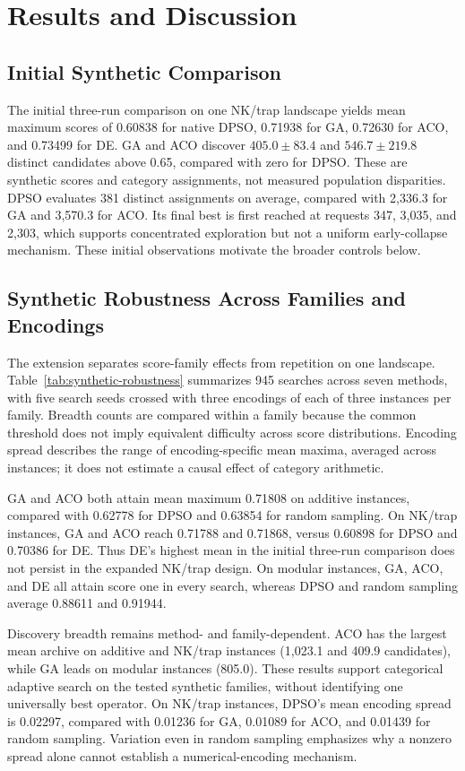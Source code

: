 \section{Results and Discussion}
\label{sec:results}

\subsection{Initial Synthetic Comparison}
The initial three-run comparison on one NK/trap landscape yields mean maximum scores of 0.60838 for native DPSO, 0.71938 for GA, 0.72630 for ACO, and 0.73499 for DE. GA and ACO discover $405.0\pm83.4$ and $546.7\pm219.8$ distinct candidates above 0.65, compared with zero for DPSO. These are synthetic scores and category assignments, not measured population disparities. DPSO evaluates 381 distinct assignments on average, compared with 2,336.3 for GA and 3,570.3 for ACO. Its final best is first reached at requests 347, 3,035, and 2,303, which supports concentrated exploration but not a uniform early-collapse mechanism. These initial observations motivate the broader controls below.


\subsection{Synthetic Robustness Across Families and Encodings}
The extension separates score-family effects from repetition on one landscape. Table~\ref{tab:synthetic-robustness} summarizes 945 searches across seven methods, with five search seeds crossed with three encodings of each of three instances per family. Breadth counts are compared within a family because the common threshold does not imply equivalent difficulty across score distributions. Encoding spread describes the range of encoding-specific mean maxima, averaged across instances; it does not estimate a causal effect of category arithmetic.

GA and ACO both attain mean maximum 0.71808 on additive instances, compared with 0.62778 for DPSO and 0.63854 for random sampling. On NK/trap instances, GA and ACO reach 0.71788 and 0.71868, versus 0.60898 for DPSO and 0.70386 for DE. Thus DE's highest mean in the initial three-run comparison does not persist in the expanded NK/trap design. On modular instances, GA, ACO, and DE all attain score one in every search, whereas DPSO and random sampling average 0.88611 and 0.91944.

Discovery breadth remains method- and family-dependent. ACO has the largest mean archive on additive and NK/trap instances (1,023.1 and 409.9 candidates), while GA leads on modular instances (805.0). These results support categorical adaptive search on the tested synthetic families, without identifying one universally best operator. On NK/trap instances, DPSO's mean encoding spread is 0.02297, compared with 0.01236 for GA, 0.01089 for ACO, and 0.01439 for random sampling. Variation even in random sampling emphasizes why a nonzero spread alone cannot establish a numerical-encoding mechanism.

